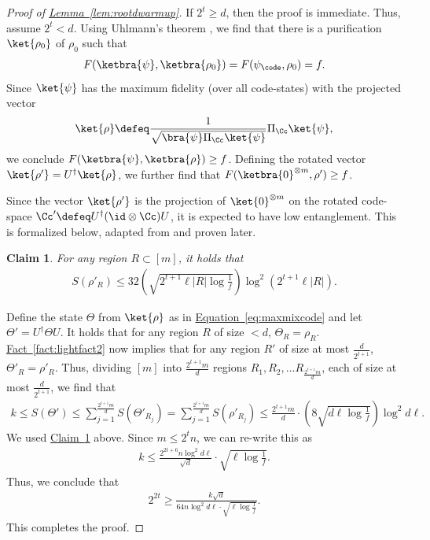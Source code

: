 \documentclass[11pt]{article}
\newcommand{\expref}[2]{\texorpdfstring{\hyperref[#2]{#1~\ref{#2}}}{#1~\ref{#2}}}
\newcommand{\expeqref}[2]{\texorpdfstring{\hyperref[#2]{#1~\eqref{#2}}}{#1~\eqref{#2}}}
\newtheorem{claim}[theorem]{Claim}
\begin{document}
\begin{proof}[Proof of \expref{Lemma}{lem:rootdwarmup}]
%
If  %
$2^t\geq d$, then the proof is immediate. Thus, assume $2^t< d$. Using Uhlmann's theorem \cite{uhlmann76}, we find that there is a purification $\ket{\rho_0}$ of $\rho_0$ such that 
\begin{align}F(\ketbra{\psi},\ketbra{\rho_0})=F(\psi_{\code},\rho_0)= f.
\end{align}
Since $\ket{\psi}$ has the maximum fidelity (over all code-states) with the projected vector 
\begin{align}\ket{\rho} \defeq \frac{1}{\sqrt{\bra{\psi}\Pi_\Cc\ket{\psi}}}\Pi_\Cc\ket{\psi},\end{align} we conclude $F(\ketbra{\psi},\ketbra{\rho})\geq f$. Defining the rotated vector $\ket{\rho'}=U^{\dagger}\ket{\rho}$, we further find that $F(\ketbra{0}^{\otimes m}, \rho')\geq f$.

Since the vector $\ket{\rho'}$ is the projection of $\ket{0}^{\otimes m}$ on the rotated code-space $\Cc'\defeq U^{\dagger}(\id\otimes \Cc) U$, it is expected to have low entanglement. This is formalized below, adapted from \cite{hastings2007area_law, AradLV12, AradKLV13} and proven later.
\begin{claim}
\label{clm:quadlowent}
For any region $R\subset [m]$, it holds that
\begin{align}S(\rho'_R) \leq 32\left(\sqrt{2^{t+1}\ell|R|\log\frac{1}{f}}\right)\log^2 (2^{t+1}\ell|R|).\end{align} 
\end{claim}

Define the state $\Theta$ from $\ket{\rho}$ as in \expeqref{Equation}{eq:maxmixcode} and let $\Theta'= U^{\dagger}\Theta U$. It holds that for any region $R$ of size $<d$, $\Theta_R=\rho_R$. \expref{Fact}{fact:lightfact2} now implies that for any region $R'$ of size at most $\frac{d}{2^{t+1}}$, $\Theta'_R=\rho'_R$. Thus, dividing $[m]$ into $\frac{2^{t+1}m}{d}$ regions $R_1,R_2, \ldots R_{\frac{2^{t+1}m}{d}}$, each of size at most $\frac{d}{2^{t+1}}$, we find that 
\begin{align}k\leq S(\Theta') \leq \sum_{j=1}^{\frac{2^{t+1}m}{d}}S(\Theta'_{R_j})=\sum_{j=1}^{\frac{2^{t+1}m}{d}}S(\rho'_{R_j})\leq \frac{2^{t+1}m}{d}\cdot \left(8\sqrt{d\ell\log\frac{1}{f}}\right)\log^2 d\ell.\end{align}
We used \expref{Claim}{clm:quadlowent} above. Since $m\leq 2^tn$, we can re-write this as
\begin{align}
k \leq \frac{2^{2t+6}n\log^2 d\ell}{\sqrt{d}}\cdot \sqrt{\ell\log\frac{1}{f}}.\end{align}
Thus, we conclude that 
\begin{align}2^{2t}\geq \frac{k\sqrt{d}}{64 n \log^2 d\ell \cdot \sqrt{\ell\log\frac{1}{f}}}.\end{align}
This completes the proof.
\end{proof}
\end{document}
